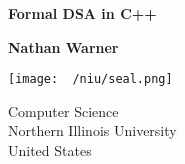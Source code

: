 \documentclass{report}
\title{\Huge{}}
\author{\huge{Nathan Warner}}
\date{\huge{}}
\begin{document}
        \begin{titlepage}
       \begin{center}
           \vspace*{1cm}
    
           \textbf{Formal DSA in C++}
    
           \vspace{0.5cm}
            
                
           \vspace{1.5cm}
    
           \textbf{Nathan Warner}
    
           \vfill
                
                
           \vspace{0.8cm}
         
           \texttt{[image: ~/niu/seal.png]}
                
           Computer Science \\
           Northern Illinois University\\
           United States\\
           
                
       \end{center}
    \end{titlepage}
    \tableofcontents
    \pagebreak 
       \pagebreak 
\end{document}

